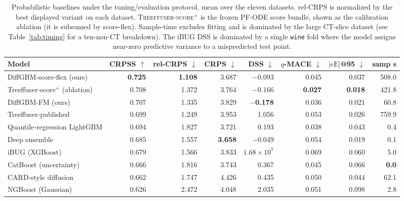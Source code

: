 \documentclass{article}
\begin{document}
\begin{table}[!h]
  \centering
  \caption{Probabilistic baselines under the tuning/evaluation protocol, mean over the eleven datasets. rel-CRPS is normalized by the best displayed variant on each dataset. \textsc{Treeffuser-score$^+$} is the frozen PF-ODE score bundle, shown as the calibration ablation (it is subsumed by score-flex). Sample-time excludes fitting and is dominated by the large CT-slice dataset (see Table~\ref{tab:timing} for a ten-non-CT breakdown). The iBUG DSS is dominated by a single \texttt{wine} fold where the model assigns near-zero predictive variance to a mispredicted test point.}\label{tab:competitors}
  \scriptsize
  \begin{tabular}{lrrrrrrr}
    \toprule
    Model & CRPSS $\uparrow$ & rel-CRPS $\downarrow$ & CRPS $\downarrow$ & DSS $\downarrow$ & $q$-MACE $\downarrow$ & $|\text{cE}|$@95 $\downarrow$ & samp s \\
    \midrule
    DiffGBM-score-flex (ours)       & \textbf{0.725} & \textbf{1.108} & 3.687 & $-$0.093 & 0.045 & 0.037 & 508.0 \\
    Treeffuser-score$^+$ (ablation) & 0.708 & 1.372 & 3.764 & $-$0.166 & \textbf{0.027} & \textbf{0.018} & 421.8 \\
    DiffGBM-FM (ours)               & 0.707 & 1.335 & 3.829 & \textbf{$-$0.178} & 0.036 & 0.021 & 60.8 \\
    Treeffuser-published            & 0.699 & 1.249 & 3.953 & 1.056 & 0.053 & 0.026 & 759.9 \\
    Quantile-regression LightGBM    & 0.694 & 1.827 & 3.721 & 0.193 & 0.038 & 0.043 & 0.4 \\
    Deep ensemble                   & 0.685 & 1.557 & \textbf{3.658} & $-$0.049 & 0.054 & 0.019 & 0.1 \\
    iBUG (XGBoost)                  & 0.679 & 1.566 & 3.833 & $1.68{\times}10^7$ & 0.069 & 0.060 & 5.0 \\
    CatBoost (uncertainty)          & 0.666 & 1.816 & 3.743 & 0.367 & 0.045 & 0.066 & \textbf{0.0} \\
    CARD-style diffusion            & 0.662 & 1.747 & 4.426 & 0.435 & 0.050 & 0.044 & 62.1 \\
    NGBoost (Gaussian)              & 0.626 & 2.472 & 4.048 & 2.035 & 0.051 & 0.098 & 2.8 \\
    \bottomrule
  \end{tabular}
\end{table}
\end{document}
